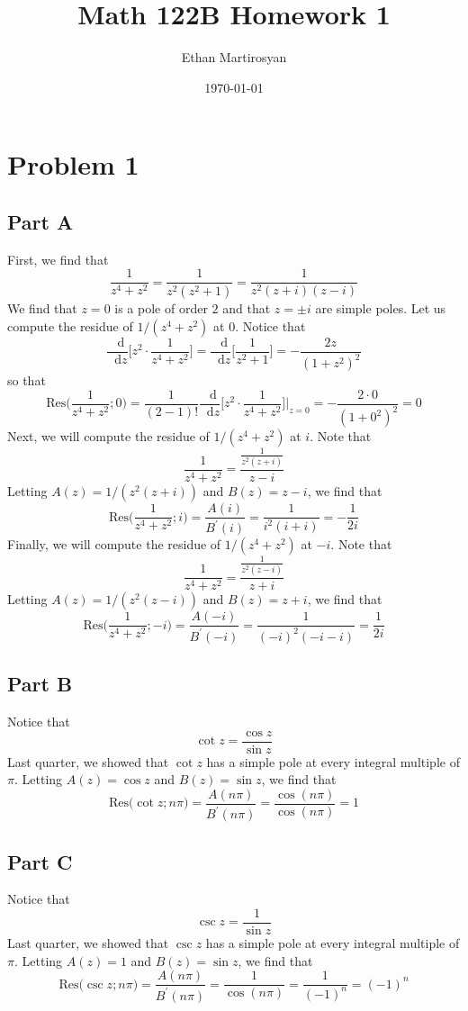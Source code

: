 \documentclass[12pt]{article}
\newcommand*\diff{\mathop{}\!\mathrm{d}}
\begin{document}
 
\title{Math 122B Homework 1}
\author{Ethan Martirosyan}
\date{\today}
\maketitle
{}
\hfuzz=50pt
\section*{Problem 1}
\subsection*{Part A}
First, we find that
\[
\frac{1}{z^4+z^2} = \frac{1}{z^2(z^2+1)} = \frac{1}{z^2(z+i)(z-i)}
\] We find that $z = 0$ is a pole of order $2$ and that $z = \pm i$ are simple poles. Let us compute the residue of $1/(z^4+z^2)$ at $0$. Notice that
\[
\frac{\diff }{\diff z} \bigg[ z^2 \cdot \frac{1}{z^4 + z^2}\bigg] = \frac{\diff }{\diff z} \bigg[ \frac{1}{z^2 + 1}\bigg] = -\frac{2z}{(1+z^2)^2}
\]
so that
\[
\text{Res}\bigg(\frac{1}{z^4+z^2}; 0\bigg) = \frac{1}{(2-1)!} \frac{\diff }{\diff z} \bigg[ z^2 \cdot \frac{1}{z^4 + z^2}\bigg]\bigg|_{z=0}  =  -\frac{2\cdot 0}{(1+0^2)^2} = 0
\] Next, we will compute the residue of $1/(z^4+z^2)$ at $i$. Note that
\[
\frac{1}{z^4 + z^2} = \frac{\frac{1}{z^2(z+i)}}{z-i}
\] Letting $A(z) = 1/(z^2(z+i))$ and $B(z) = z-i$, we find that
\[
\text{Res}\bigg(\frac{1}{z^4+z^2}; i\bigg) = \frac{A(i)}{B^\prime(i)} = \frac{1}{i^2(i+i)} = -\frac{1}{2i}
\] Finally, we will compute the residue of $1/(z^4+z^2)$ at $-i$. Note that
\[
\frac{1}{z^4 + z^2} = \frac{\frac{1}{z^2(z-i)}}{z+i}
\] Letting $A(z) = 1/(z^2(z-i))$ and $B(z) = z+i$, we find that
\[
\text{Res}\bigg(\frac{1}{z^4+z^2}; -i\bigg) = \frac{A(-i)}{B^\prime(-i)} = \frac{1}{(-i)^2(-i-i)} = \frac{1}{2i}
\]
\subsection*{Part B}
Notice that
\[
\cot z = \frac{\cos z}{\sin z}
\] Last quarter, we showed that $\cot z$ has a simple pole at every integral multiple of $\pi$. Letting $A(z) = \cos z$ and $B(z) = \sin z$, we find that
\[
\text{Res}\bigg(\cot z; n \pi\bigg) = \frac{A(n\pi)}{B^\prime(n\pi)} = \frac{\cos(n\pi)}{\cos(n\pi)} = 1
\]
\subsection*{Part C}
Notice that
\[
\csc z = \frac{1}{\sin z}
\] Last quarter, we showed that $\csc z$ has a simple pole at every integral multiple of $\pi$. Letting $A(z) = 1$ and $B(z) = \sin z$, we find that
\[
\text{Res}\bigg(\csc z; n\pi\bigg) = \frac{A(n\pi)}{B^\prime(n\pi)} = \frac{1}{\cos(n\pi)} = \frac{1}{(-1)^n} = (-1)^n
\]
\end{document}

